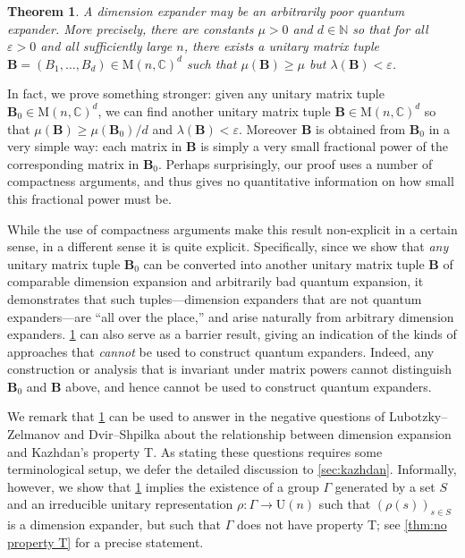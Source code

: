 \documentclass[11pt]{article}
\newtheorem{theorem}{Theorem}[section]
\newcommand{\N}{{\mathbb N}}
\theoremstyle{plain}
\numberwithin{equation}{section}
\theoremstyle{definition}
\newcommand{\bC}{\mathbb{C}}
\newcommand{\M}{\mathrm{M}}
\newcommand{\U}{\mathrm{U}}
\newcommand{\tuple}[1]{\mathbf{#1}}
\newcommand{\vB}{\tuple{B}}
\begin{document}
\begin{theorem}\label{thm:main-negative}
    A dimension expander may be an arbitrarily poor quantum expander. More precisely,
    there are constants $\mu>0$ and $d \in \N$ so that for all $\varepsilon>0$ and all sufficiently large $n$, there exists a unitary matrix tuple $\vB =(B_1,\dots,B_d) \in \M(n,\bC)^d$ such that $\mu(\vB) \geq \mu$ but $\lambda(\vB) < \varepsilon$.
\end{theorem}

In fact, we prove something stronger: given any unitary matrix tuple $\vB_0 \in \M(n,\bC)^d$, we can find another unitary matrix tuple $\vB \in \M(n,\bC)^d$ so that $\mu(\vB) \geq \mu(\vB_0)/d$ and $\lambda(\vB) < \varepsilon$. Moreover $\vB$ is obtained from $\vB_0$ in a very simple way: each matrix in $\vB$ is simply a very small fractional power of the corresponding matrix in $\vB_0$. Perhaps surprisingly, our proof uses a number of compactness arguments, and thus gives no quantitative information on how small this fractional power must be.

While the use of compactness arguments make this result non-explicit in a certain sense, in a different sense it is quite explicit. 
%
%
Specifically, %
since we show that \emph{any} unitary matrix tuple $\vB_0$ can be converted into another unitary matrix tuple $\vB$ of comparable dimension expansion and arbitrarily bad quantum expansion, it demonstrates that such tuples---dimension expanders that are not quantum expanders---are ``all over the place,'' and arise naturally from arbitrary dimension expanders. \cref{thm:main-negative} can also serve as a barrier result, giving an indication of the kinds of approaches that \emph{cannot} be used to construct quantum expanders. 
%
Indeed, %
any construction or analysis that is invariant under matrix powers cannot distinguish $\vB_0$ and $\vB$ above, and hence cannot be used to construct quantum expanders.
%
%

We remark that \cref{thm:main-negative} can be used to answer in the negative questions of Lubotzky--Zelmanov \cite[Remark/Question 2.5]{LUBOTZKY2008730} and Dvir--Shpilka \cite[Question 1]{DS09} about the relationship between dimension expansion and Kazhdan's property T. As stating these questions requires some terminological setup, we defer the detailed discussion to \cref{sec:kazhdan}. Informally, however, we show that \cref{thm:main-negative} implies the existence of a group $\Gamma$ generated by a set $S$ and an irreducible unitary representation $\rho:\Gamma \to \U(n)$ such that $(\rho(s))_{s \in S}$ is a dimension expander, but such that $\Gamma$ does not have property T; see \cref{thm:no property T} for a precise statement.
\end{document}
